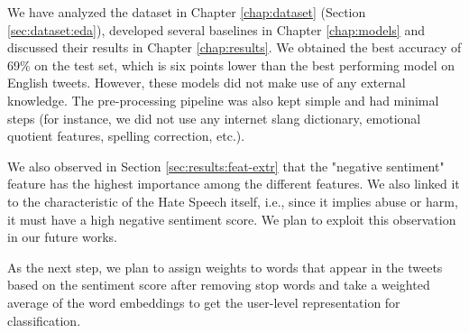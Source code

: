 We have analyzed the dataset in Chapter \ref{chap:dataset} (Section \ref{sec:dataset:eda}), developed several baselines in Chapter \ref{chap:models} and discussed their results in Chapter \ref{chap:results}. We obtained the best accuracy of 69\% on the test set, which is six points lower than the best performing model on English tweets. However, these models did not make use of any external knowledge. The pre-processing pipeline was also kept simple and had minimal steps (for instance, we did not use any internet slang dictionary, emotional quotient features, spelling correction, etc.).

We also observed in Section \ref{sec:results:feat-extr} that the "negative sentiment" feature has the highest importance among the different features. We also linked it to the characteristic of the Hate Speech itself, i.e., since it implies abuse or harm, it must have a high negative sentiment score. We plan to exploit this observation in our future works.

As the next step, we plan to assign weights to words that appear in the tweets based on the sentiment score after removing stop words and take a weighted average of the word embeddings to get the user-level representation for classification.

